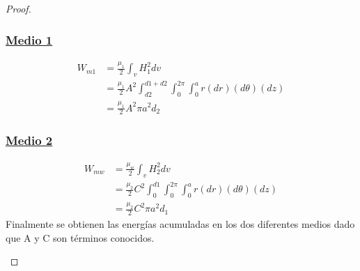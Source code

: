\begin{proof}
\begin{enumerate}
    \subsubsection*{\underline{Medio 1}}
    \begin{align}
        W_{m1} &= \frac{\mu_{1}}{2}\int_{v} H_{1}^{2} dv\\
               &= \frac{\mu_{1}}{2}A^{2} \int_{d2}^{d1+d2} \int_{0}^{2\pi} \int_{0}^{a} r (dr) (d\theta) (dz)\\
               &=\frac{\mu_{1}}{2} A^{2} \pi a^{2}d_{2} 
    \end{align}
    \subsubsection*{\underline{Medio 2}}
    \begin{align}
        W_{mw} &= \frac{\mu_{w}}{2}\int_{v} H_{2}^{2} dv\\
               &= \frac{\mu_{2}}{2}C^{2} \int_{0}^{d1} \int_{0}^{2\pi} \int_{0}^{a} r (dr) (d\theta) (dz)\\
               &=\frac{\mu_{2}}{2} C^{2} \pi a^{2}d_{1} 
    \end{align}
    Finalmente se obtienen las energías acumuladas en los dos diferentes medios dado que A y C son términos conocidos.
\end{enumerate}

\end{proof}
\newpage

